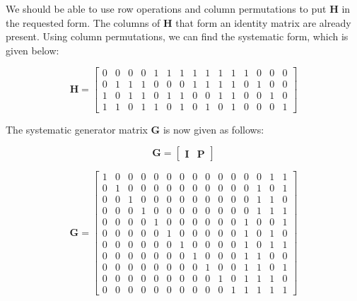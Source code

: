 \documentclass[fleqn]{article}
\begin{document}
\begin{enumerate}
\begin{enumerate}
			We should be able to use row operations and column permutations to put $\mathbf{H}$ in the requested form. The columns of $\mathbf{H}$ that form an identity matrix are already present. Using column permutations, we can find the systematic form, which is given below:
			
			\begin{equation*}
				\mathbf{H} = \begin{bmatrix}
					0 & 0 & 0 & 0 & 1 & 1 & 1 & 1 & 1 & 1 & 1 & 1 & 0 & 0 & 0 \\
					0 & 1 & 1 & 1 & 0 & 0 & 0 & 1 & 1 & 1 & 1 & 0 & 1 & 0 & 0 \\
					1 & 0 & 1 & 1 & 0 & 1 & 1 & 0 & 0 & 1 & 1 & 0 & 0 & 1 & 0 \\
					1 & 1 & 0 & 1 & 1 & 0 & 1 & 0 & 1 & 0 & 1 & 0 & 0 & 0 & 1
				\end{bmatrix}
			\end{equation*}
		
			The systematic generator matrix $\mathbf{G}$ is now given as follows:
			
			\begin{equation*}
				\mathbf{G} = \left[\begin{array}{c|c}
					\mathbf{I} & \mathbf{P}
				\end{array}\right]
			\end{equation*}
			
			\begin{equation*}
				\mathbf{G} = \begin{bmatrix}
					1 & 0 & 0 & 0 & 0 & 0 & 0 & 0 & 0 & 0 & 0 & 0 & 0 & 1 & 1\\
					0 & 1 & 0 & 0 & 0 & 0 & 0 & 0 & 0 & 0 & 0 & 0 & 1 & 0 & 1\\
					0 & 0 & 1 & 0 & 0 & 0 & 0 & 0 & 0 & 0 & 0 & 0 & 1 & 1 & 0\\
					0 & 0 & 0 & 1 & 0 & 0 & 0 & 0 & 0 & 0 & 0 & 0 & 1 & 1 & 1\\
					0 & 0 & 0 & 0 & 1 & 0 & 0 & 0 & 0 & 0 & 0 & 1 & 0 & 0 & 1\\
					0 & 0 & 0 & 0 & 0 & 1 & 0 & 0 & 0 & 0 & 0 & 1 & 0 & 1 & 0\\
					0 & 0 & 0 & 0 & 0 & 0 & 1 & 0 & 0 & 0 & 0 & 1 & 0 & 1 & 1\\
					0 & 0 & 0 & 0 & 0 & 0 & 0 & 1 & 0 & 0 & 0 & 1 & 1 & 0 & 0\\
					0 & 0 & 0 & 0 & 0 & 0 & 0 & 0 & 1 & 0 & 0 & 1 & 1 & 0 & 1\\
					0 & 0 & 0 & 0 & 0 & 0 & 0 & 0 & 0 & 1 & 0 & 1 & 1 & 1 & 0\\
					0 & 0 & 0 & 0 & 0 & 0 & 0 & 0 & 0 & 0 & 1 & 1 & 1 & 1 & 1
				\end{bmatrix}
			\end{equation*}
			

\end{enumerate}
\end{enumerate}
\end{document}
